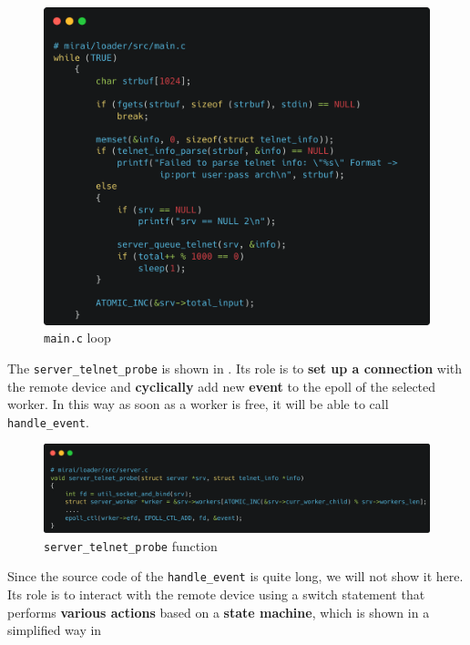 \begin{figure}[ht]
    \centering
    \includegraphics[scale=0.1]{resources/images/main.png}
    \caption{\texttt{main.c} loop}
    \label{fig:mainloop}
\end{figure}

The \texttt{server\_telnet\_probe} is shown in . Its role is to \textbf{set up a connection} with the remote device and \textbf{cyclically} add new \textbf{event} to the epoll of the selected worker. In this way as soon as a worker is free, it will be able to call \texttt{handle\_event}.

\begin{figure}[ht]
    \centering
    \includegraphics[scale=0.15]{resources/images/sever_telnet_probe.png}
    \caption{\texttt{server\_telnet\_probe} function}
    \label{fig:server-telnet-probe}
\end{figure}

Since the source code of the \texttt{handle\_event} is quite long, we will not show it here. Its role is to interact with the remote device using a switch statement that performs \textbf{various actions} based on a \textbf{state machine}, which is shown in a simplified way in 

